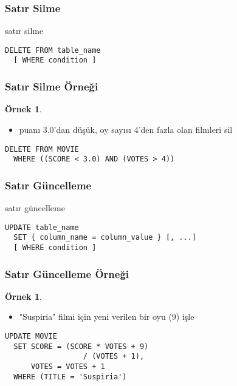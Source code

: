 \documentclass[dvipsnames]{beamer}
\theoremstyle{definition}
\theoremstyle{example}
\newtheorem{ornek}[theorem]{Örnek}
\theoremstyle{plain}
\begin{document}
\begin{frame}[fragile]
  \frametitle{Satır Silme}

  \begin{block}{satır silme}
    \begin{lstlisting}
DELETE FROM table_name
  [ WHERE condition ]
    \end{lstlisting}
  \end{block}
\end{frame}

\begin{frame}[fragile]
  \frametitle{Satır Silme Örneği}

  \begin{ornek}
    \begin{itemize}
      \item puanı 3.0'dan düşük, oy sayısı 4'den fazla olan filmleri sil
    \end{itemize}

    \begin{lstlisting}
DELETE FROM MOVIE
  WHERE ((SCORE < 3.0) AND (VOTES > 4))
    \end{lstlisting}
  \end{ornek}
\end{frame}

\begin{frame}[fragile]
  \frametitle{Satır Güncelleme}

  \begin{block}{satır güncelleme}
    \begin{lstlisting}
UPDATE table_name
  SET { column_name = column_value } [, ...]
  [ WHERE condition ]
    \end{lstlisting}
  \end{block}
\end{frame}

\begin{frame}[fragile]
  \frametitle{Satır Güncelleme Örneği}

  \begin{ornek}
    \begin{itemize}
      \item "Suspiria" filmi için yeni verilen bir oyu (9) işle
    \end{itemize}

    \begin{lstlisting}
UPDATE MOVIE
  SET SCORE = (SCORE * VOTES + 9)
                  / (VOTES + 1),
      VOTES = VOTES + 1
  WHERE (TITLE = 'Suspiria')
    \end{lstlisting}
  \end{ornek}
\end{frame}
\end{document}

